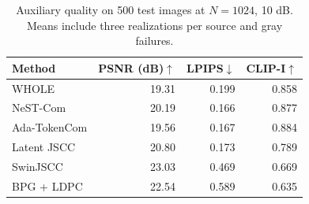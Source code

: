 \begin{table}[t]
\caption{Auxiliary quality on 500 test images at $N=1024$, 10 dB. Means include three realizations per source and gray failures.}
\label{tab:external}\centering\footnotesize\setlength{\tabcolsep}{5pt}
\begin{tabular}{@{}lrrr@{}}\toprule
Method & PSNR (dB)$\uparrow$ & LPIPS$\downarrow$ & CLIP-I$\uparrow$\\\midrule
WHOLE & 19.31 & 0.199 & 0.858\\
NeST-Com & 20.19 & 0.166 & 0.877\\
Ada-TokenCom & 19.56 & 0.167 & 0.884\\
Latent JSCC & 20.80 & 0.173 & 0.789\\
SwinJSCC & 23.03 & 0.469 & 0.669\\
BPG + LDPC & 22.54 & 0.589 & 0.635\\
\bottomrule\end{tabular}\end{table}
